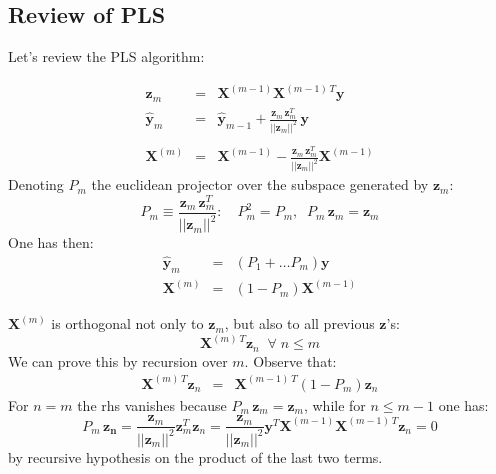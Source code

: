 

\subsection*{Review of PLS}
Let's review the PLS algorithm:

\begin{eqnarray}
    \mathbf{z}_m & = & \mathbf{X}^{(m - 1)} \mathbf{X}^{(m - 1)\, T} \mathbf{y} \\ \label{eq:3p18_recy}
    \hat{\mathbf{y}}_m & = & \hat{\mathbf{y}}_{m - 1} + \frac{\mathbf{z}_m \, \mathbf{z}_m^T}{||\mathbf{z}_m||^2}\, \mathbf{y}\\
    \\
    \mathbf{X}^{(m)} & = & \mathbf{X}^{(m - 1)} - \frac{\mathbf{z}_m \, \mathbf{z}_m^T}{||\mathbf{z}_m||^2} \mathbf{X}^{(m - 1)}
\end{eqnarray}
Denoting $P_m$ the euclidean projector over the subspace generated by $\mathbf{z}_m$:
\begin{equation*}
P_m  \equiv \frac{\mathbf{z}_m \, \mathbf{z}_m^T}{||\mathbf{z}_m||^2}: \quad P_m^2 = P_m, \;\; P_m \, \mathbf{z}_m = \mathbf{z}_m
\end{equation*}
One has then:
\begin{eqnarray}
    \hat{\mathbf{y}}_m & = & \left(P_1 + \ldots P_m\right) \mathbf{y}  \\ 
    \label{eq:3p18_recX}
    \mathbf{X}^{(m)} & = & \left(1 - P_m\right) \mathbf{X}^{(m - 1)}    
\end{eqnarray}

$\mathbf{X}^{(m)}$ is orthogonal not only to $\mathbf{z}_m$, but also to
all previous $\mathbf{z}$'s:
\begin{equation*}
\mathbf{X}^{(m)\,T} \mathbf{z}_n \;\; \forall\; n \leq m
\end{equation*}
We can prove this by recursion over $m$. Observe that:
\begin{eqnarray*}
    \mathbf{X}^{(m)\,T} \mathbf{z}_n & = & \mathbf{X}^{(m - 1)\,T}
        \left(1 - P_m\right) \mathbf{z}_n
\end{eqnarray*}
For $n = m$ the rhs vanishes because $P_m \, \mathbf{z}_m = \mathbf{z}_m$,
while for $n \leq m - 1$ one has:
\begin{equation*}
P_m\, \mathbf{z_n} = \frac{\mathbf{z}_m}{||\mathbf{z}_m||^2} \mathbf{z}_m^T \mathbf{z}_n = \frac{\mathbf{z}_m}{||\mathbf{z}_m||^2} \mathbf{y}^T \mathbf{X}^{(m - 1)} \mathbf{X}^{(m - 1)\, T} \mathbf{z}_n = 0
\end{equation*}
by recursive hypothesis on the product of the last two terms.

